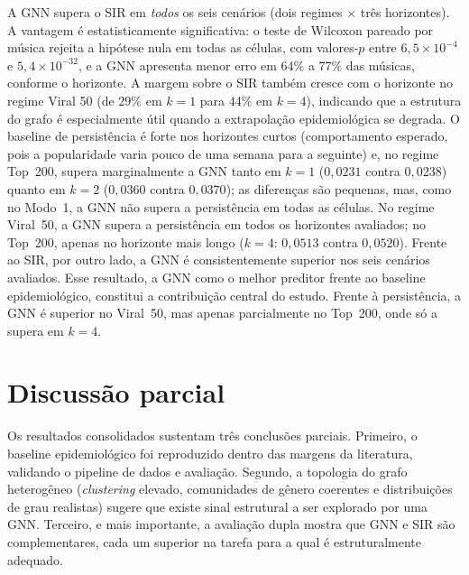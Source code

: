 A GNN supera o SIR em \emph{todos} os seis cenários (dois regimes $\times$ três horizontes). A vantagem é estatisticamente significativa: o teste de Wilcoxon pareado por música rejeita a hipótese nula em todas as células, com valores-$p$ entre $6{,}5 \times 10^{-4}$ e $5{,}4 \times 10^{-32}$, e a GNN apresenta menor erro em 64\% a 77\% das músicas, conforme o horizonte. A margem sobre o SIR também cresce com o horizonte no regime Viral 50 (de $29\%$ em $k=1$ para $44\%$ em $k=4$), indicando que a estrutura do grafo é especialmente útil quando a extrapolação epidemiológica se degrada. O baseline de persistência é forte nos horizontes curtos (comportamento esperado, pois a popularidade varia pouco de uma semana para a seguinte) e, no regime Top~200, supera marginalmente a GNN tanto em $k=1$ ($0{,}0231$ contra $0{,}0238$) quanto em $k=2$ ($0{,}0360$ contra $0{,}0370$); as diferenças são pequenas, mas, como no Modo~1, a GNN não supera a persistência em todas as células. No regime Viral~50, a GNN supera a persistência em todos os horizontes avaliados; no Top~200, apenas no horizonte mais longo ($k=4$: $0{,}0513$ contra $0{,}0520$). Frente ao SIR, por outro lado, a GNN é consistentemente superior nos seis cenários avaliados. Esse resultado, a GNN como o melhor preditor frente ao baseline epidemiológico, constitui a contribuição central do estudo. Frente à persistência, a GNN é superior no Viral~50, mas apenas parcialmente no Top~200, onde só a supera em $k=4$.


\section{Discussão parcial}

Os resultados consolidados sustentam três conclusões parciais. Primeiro, o baseline epidemiológico foi reproduzido dentro das margens da literatura, validando o pipeline de dados e avaliação. Segundo, a topologia do grafo heterogêneo (\textit{clustering} elevado, comunidades de gênero coerentes e distribuições de grau realistas) sugere que existe sinal estrutural a ser explorado por uma GNN. Terceiro, e mais importante, a avaliação dupla mostra que GNN e SIR são complementares, cada um superior na tarefa para a qual é estruturalmente adequado.


